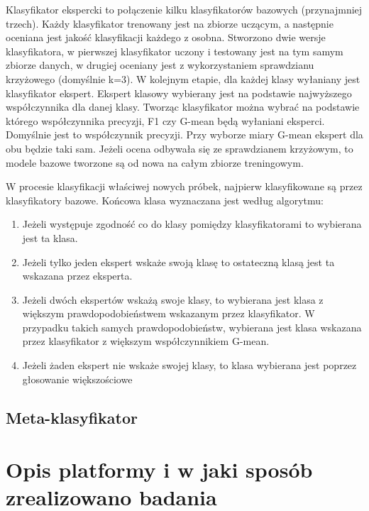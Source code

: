 Klasyfikator ekspercki to połączenie kilku klasyfikatorów bazowych (przynajmniej trzech). Każdy klasyfikator trenowany jest na zbiorze uczącym, a następnie oceniana jest jakość klasyfikacji każdego z osobna. Stworzono dwie wersje klasyfikatora, w pierwszej klasyfikator uczony i testowany jest na tym samym zbiorze danych, w drugiej oceniany jest z wykorzystaniem sprawdzianu krzyżowego (domyślnie k=3). W kolejnym etapie, dla każdej klasy wyłaniany jest klasyfikator ekspert. Ekspert klasowy wybierany jest na podstawie najwyższego współczynnika dla danej klasy. Tworząc klasyfikator można wybrać na podstawie którego współczynnika precyzji, F1 czy G-mean będą wyłaniani eksperci. Domyślnie jest to współczynnik precyzji. Przy wyborze miary G-mean ekspert dla obu będzie taki sam. Jeżeli ocena odbywała się ze sprawdzianem krzyżowym, to modele bazowe tworzone są od nowa na całym zbiorze treningowym. \par
W procesie klasyfikacji właściwej nowych próbek, najpierw klasyfikowane są przez klasyfikatory bazowe. Końcowa klasa wyznaczana jest według algorytmu:
\begin{enumerate}
	\item Jeżeli występuje zgodność co do klasy pomiędzy klasyfikatorami to wybierana jest ta klasa.
	\item Jeżeli tylko jeden ekspert wskaże swoją klasę to ostateczną klasą jest ta wskazana przez eksperta.
	\item Jeżeli dwóch ekspertów wskażą swoje klasy, to wybierana jest klasa z większym prawdopodobieństwem wskazanym przez klasyfikator. W przypadku takich samych prawdopodobieństw, wybierana jest klasa wskazana przez klasyfikator z większym współczynnikiem G-mean.
	\item Jeżeli żaden ekspert nie wskaże swojej klasy, to klasa wybierana jest poprzez głosowanie większościowe
\end{enumerate}

\subsection{Meta-klasyfikator}
\section{Opis platformy i w jaki sposób zrealizowano badania}

